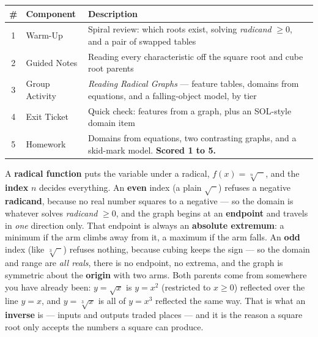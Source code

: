 \documentclass[10pt]{article}
\begin{document}
\begin{tocbox}
\small
\renewcommand{\arraystretch}{1.5}
\begin{tabularx}{\linewidth}{@{} c l X @{}}
\rowcolor{forestbg}
\textbf{\#} & \textbf{Component} & \textbf{Description} \\
\midrule
1 & Warm-Up        & Spiral review: which roots exist, solving \emph{radicand} $\ge 0$, and a pair of swapped tables \\
2 & Guided Notes   & Reading every characteristic off the square root and cube root parents \\
3 & Group Activity & \emph{Reading Radical Graphs} --- feature tables, domains from equations, and a falling-object model, by tier \\
4 & Exit Ticket    & Quick check: features from a graph, plus an SOL-style domain item \\
5 & Homework       & Domains from equations, two contrasting graphs, and a skid-mark model. \textbf{Scored 1 to 5.} \\
\end{tabularx}
\end{tocbox}

\vspace{0.10in}

\begin{remindbox}
\small A \textbf{radical function} puts the variable under a radical, $f(x)=\sqrt[n]{\phantom{x}\,}$,
and the \textbf{index} $n$ decides everything. An \textbf{even} index (a plain $\sqrt{\phantom{x}}$)
refuses a negative \textbf{radicand}, because no real number squares to a negative --- so the domain
is whatever solves \emph{radicand} $\ge 0$, and the graph begins at an \textbf{endpoint} and travels
in \emph{one} direction only. That endpoint is always an \textbf{absolute extremum}: a minimum if the
arm climbs away from it, a maximum if the arm falls. An \textbf{odd} index (like $\sqrt[3]{\phantom{x}}$)
refuses nothing, because cubing keeps the sign --- so the domain and range are \emph{all reals}, there
is no endpoint, no extrema, and the graph is symmetric about the \textbf{origin} with two arms.
Both parents come from somewhere you have already been: $y=\sqrt{x}$ is $y=x^2$ (restricted to
$x\ge 0$) reflected over the line $y=x$, and $y=\sqrt[3]{x}$ is all of $y=x^3$ reflected the same way.
That is what an \textbf{inverse} is --- inputs and outputs traded places --- and it is the reason a
square root only accepts the numbers a square can produce.
\end{remindbox}
\end{document}
